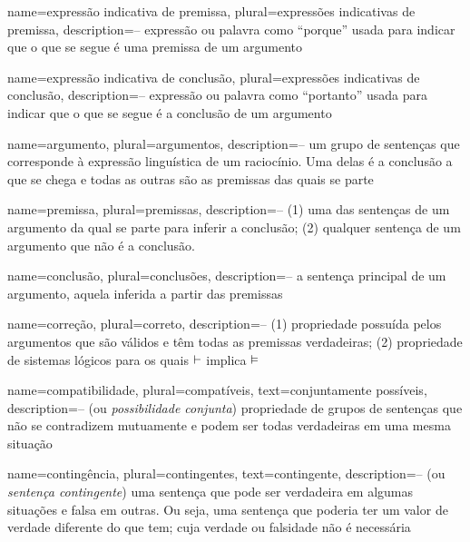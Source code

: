 

\makeglossaries



{
 name=expressão indicativa de premissa,
 plural=expressões indicativas de premissa,
 description={-- expressão ou palavra como ``porque'' usada para indicar que o que se segue é uma premissa de um argumento}
}

{
 name=expressão indicativa de conclusão,
 plural=expressões indicativas de conclusão,
 description={-- expressão ou palavra como ``portanto'' usada para indicar que o que se segue é a conclusão de um argumento}
}

{
 name=argumento,
 plural=argumentos,
 description={-- um grupo de sentenças que corresponde à expressão linguística de um raciocínio. Uma delas é a conclusão a que se chega e todas as outras são as premissas das quais se parte}
}

{
 name=premissa,
 plural=premissas,
 description={-- (1) uma das sentenças de um argumento da qual se parte para inferir a conclusão; (2) qualquer sentença de um argumento que não é a conclusão.}
}

{
 name=conclusão,
 plural=conclusões,
 description={-- a sentença principal de um argumento, aquela inferida a partir das premissas}
}

{
 name=correção,
 plural=correto,
 description={-- (1) propriedade possuída pelos argumentos que são válidos e têm todas as premissas verdadeiras; (2) propriedade de sistemas lógicos para os quais $\vdash$ implica $\vDash$}
}

{
 name=compatibilidade,
 plural=compatíveis,
 text={conjuntamente possíveis}, %
 description={-- (ou \textit{possibilidade conjunta}) propriedade de grupos de sentenças que não se contradizem mutuamente e podem ser todas verdadeiras em uma mesma situação}
}

{
 name=contingência,
 plural=contingentes,
 text=contingente,
 description={-- (ou \textit{sentença contingente}) uma sentença que pode ser verdadeira em algumas situações e falsa em outras. Ou seja, uma sentença que poderia ter um valor de verdade diferente do que tem; cuja verdade ou falsidade não é necessária}
}

